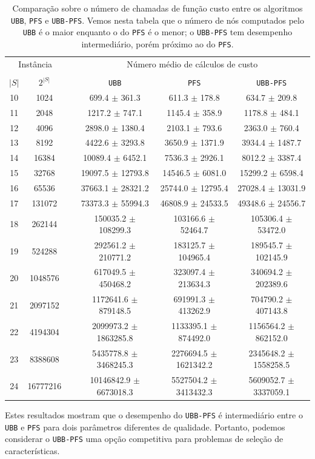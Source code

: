 \documentclass[12pt]{article}
\newcommand{\algname}[1]{\texttt{#1}}
\begin{document}
\begin{table}
\centering
\footnotesize
\caption{Comparação sobre o número de chamadas de função custo entre
os algoritmos \algname{UBB}, \algname{PFS} e \algname{UBB-PFS}. Vemos
nesta tabela que o número de nós computados pelo \algname{UBB} é o maior
enquanto o do \algname{PFS} é o menor; o \algname{UBB-PFS} tem 
desempenho intermediário, porém próximo ao do \algname{PFS}.}
\label{tab:ubbpfs_vs_ubb_vs_pfs_computed_nodes}
\begin{tabular}{cc c ccc}
\toprule
\multicolumn{2}{c}{Instância} & \phantom{} & \multicolumn{3}{c}{Número médio de cálculos de custo}\\
\cline{1-2}\cline{4-6} \\
$|S|$ & $2^{|S|}$ && \algname{UBB} & \algname{PFS} & \algname{UBB-PFS}  \\
10 &    1024  && 699.4 $\pm$ 361.3 & 611.3 $\pm$ 178.8 & 634.7 $\pm$ 209.8 \\
11 &    2048  && 1217.2 $\pm$ 747.1 & 1145.4 $\pm$ 358.9 & 1178.8 $\pm$ 484.1 \\
12 &    4096  && 2898.0 $\pm$ 1380.4 & 2103.1 $\pm$ 793.6 & 2363.0 $\pm$ 760.4 \\
13 &    8192  && 4422.6 $\pm$ 3293.8 & 3650.9 $\pm$ 1371.9 & 3934.4 $\pm$ 1487.7 \\
14 &   16384  && 10089.4 $\pm$ 6452.1 & 7536.3 $\pm$ 2926.1 & 8012.2 $\pm$ 3387.4 \\
15 &   32768  && 19097.5 $\pm$ 12793.8 & 14546.5 $\pm$ 6081.0 & 15299.2 $\pm$ 6598.4 \\
16 &   65536  && 37663.1 $\pm$ 28321.2 & 25744.0 $\pm$ 12795.4 & 27028.4 $\pm$ 13031.9 \\
17 &  131072  && 73373.3 $\pm$ 55994.3 & 46808.9 $\pm$ 24533.5 & 49348.6 $\pm$ 24556.7 \\
18 &  262144  && 150035.2 $\pm$ 108299.3 & 103166.6 $\pm$ 52464.7 & 105306.4 $\pm$ 53472.0 \\
19 &  524288  && 292561.2 $\pm$ 210771.2 & 183125.7 $\pm$ 104965.4 & 189545.7 $\pm$ 102145.9 \\
20 & 1048576  && 617049.5 $\pm$ 450468.2 & 323097.4 $\pm$ 213634.3 & 340694.2 $\pm$ 202389.6 \\
21 & 2097152  && 1172641.6 $\pm$ 879148.5 & 691991.3 $\pm$ 413262.9 & 704790.2 $\pm$ 407143.8 \\
22 & 4194304  && 2099973.2 $\pm$ 1863285.8 & 1133395.1 $\pm$ 874492.0 & 1156564.2 $\pm$ 862152.0 \\
23 & 8388608  && 5435778.8 $\pm$ 3468245.3 & 2276694.5 $\pm$ 1621342.2 & 2345648.2 $\pm$ 1558258.5 \\
24 & 16777216 && 10146842.9 $\pm$ 6673018.3 & 5527504.2 $\pm$ 3413432.3 & 5609052.7 $\pm$ 3337059.1 \\
\bottomrule
\end{tabular}
\end{table}
Estes resultados mostram que o desempenho do \algname{UBB-PFS} é 
intermediário entre o \algname{UBB} e \algname{PFS} para dois parâmetros
diferentes de qualidade. Portanto, podemos considerar o 
\algname{UBB-PFS} uma opção competitiva para problemas de seleção de 
características.
\end{document}
